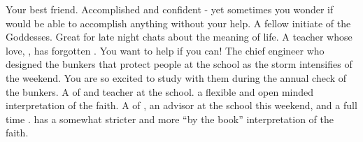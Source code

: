 \documentclass[char]{GL2020}
\begin{document}
\begin{contacts}
	\contact{\cPresident{}} Your best friend. Accomplished and confident - yet sometimes you wonder if \cPresident{\they} would be able to accomplish anything without your help.
	\contact{\cWarlordDaughter{}} A fellow initiate of the Goddesses. Great for late night chats about the meaning of life.
	\contact{\cChupAvenger{}} A teacher whose love, \cHeadScientist{}, has forgotten \cChupAvenger{\them}. You want to help if you can!
	\contact{\cBunker{}} The chief engineer who designed the bunkers that protect people at the school as the storm intensifies of the weekend. You are so excited to study with them during the annual check of the bunkers.
	\contact{\cFlowPriest{}} A \cFlowPriest{\cleric} of \cFlow{} and teacher at the school. \cFlowPriest{\They} \cFlowPriest{\have} a flexible and open minded interpretation of the faith.
	\contact{\cEbbPriest{}} A \cEbbPriest{\cleric} of \cEbb{}, an advisor at the school this weekend, and a full time \cEbbPriest{\cleric}. \cEbbPriest{} has a somewhat stricter and more ``by the book'' interpretation of the faith.
\end{contacts}
\end{document}
